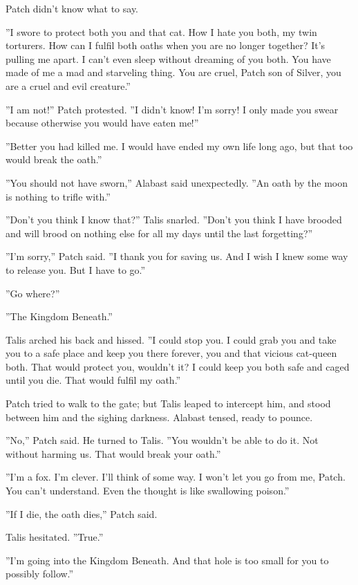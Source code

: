 \documentclass[12pt]{book}
\begin{document}
 Patch didn't know what to say.\par
 ''I swore to protect both you and that cat. How I hate you both, my twin torturers. How can I fulfil both oaths when you are no longer together? It's pulling me apart. I can't even sleep without dreaming of you both. You have made of me a mad and starveling thing. You are cruel, Patch son of Silver, you are a cruel and evil creature.''\par
 ''I am not!'' Patch protested. ''I didn't know! I'm sorry! I only made you swear because otherwise you would have eaten me!''\par
 ''Better you had killed me. I would have ended my own life long ago, but that too would break the oath.''\par
 ''You should not have sworn,'' Alabast said unexpectedly. ''An oath by the moon is nothing to trifle with.''\par
 ''Don't you think I know that?'' Talis snarled. ''Don't you think I have brooded and will brood on nothing else for all my days until the last forgetting?''\par
 ''I'm sorry,'' Patch said. ''I thank you for saving us. And I wish I knew some way to release you. But I have to go.''\par
 ''Go where?''\par
 ''The Kingdom Beneath.''\par
 Talis arched his back and hissed. ''I could stop you. I could grab you and take you to a safe place and keep you there forever, you and that vicious cat-queen both. That would protect you, wouldn't it? I could keep you both safe and caged until you die. That would fulfil my oath.''\par
 Patch tried to walk to the gate; but Talis leaped to intercept him, and stood between him and the sighing darkness. Alabast tensed, ready to pounce.\par
 ''No,'' Patch said. He turned to Talis. ''You wouldn't be able to do it. Not without harming us. That would break your oath.''\par
 ''I'm a fox. I'm clever. I'll think of some way. I won't let you go from me, Patch. You can't understand. Even the thought is like swallowing poison.''\par
 ''If I die, the oath dies,'' Patch said.\par
 Talis hesitated. ''True.''\par
 ''I'm going into the Kingdom Beneath. And that hole is too small for you to possibly follow.''\par
\end{document}
